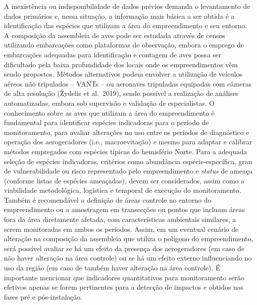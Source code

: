 \documentclass[
  oneside]{scrbook}
\begin{document}
A inexistência ou indisponibilidade de dados prévios demanda o levantamento de dados primários e, nessa situação, a informação mais básica a ser obtida é a identificação das espécies que utilizam a área do empreendimento e seu entorno. A composição da assembleia de aves pode ser estudada através de censos utilizando embarcações como plataformas de observação, embora o emprego de embarcações adequadas para identificação e contagem de aves possa ser dificultado pela baixa profundidade dos locais onde os empreendimentos vêm sendo propostos. Métodos alternativos podem envolver a utilização de veículos aéreos não tripulados -- VANTs -- ou aeronaves tripuladas equipadas com câmeras de alta resolução (Žydelis et al.~2019), sendo possível a realização de análises automatizadas, embora sob supervisão e validação de especialistas. O conhecimento sobre as aves que utilizam a área do empreendimento é fundamental para identificar espécies indicadoras para o período de monitoramento, para avaliar alterações no uso entre os períodos de diagnóstico e operação dos aerogeradores (i.e., macroevitação) e mesmo para adaptar e calibrar métodos empregados com espécies típicas do hemisfério Norte. Para a adequada seleção de espécies indicadoras, critérios como abundância espécie-específica, grau de vulnerabilidade ou risco representado pelo empreendimento e \emph{status} de ameaça (conforme listas de espécies ameaçadas), devem ser considerados, assim como a viabilidade metodológica, logística e temporal de execução do monitoramento. Também é recomendável a definição de áreas controle no entorno do empreendimento ou a amostragem em transecções ou pontos que incluam áreas fora da área diretamente afetada, com características ambientais similares, a serem monitoradas em ambos os períodos. Assim, em um eventual cenário de alteração na composição da assembleia que utiliza o polígono do empreendimento, será possível avaliar se há um efeito da presença dos aerogeradores (em caso de não haver alteração na área controle) ou se há um efeito externo influenciando no uso da região (em caso de também haver alteração na área controle). É importante mencionar que indicadores quantitativos para monitoramento serão efetivos apenas se forem pertinentes para a detecção de impactos e obtidos nas fases pré e pós-instalação.
\end{document}
